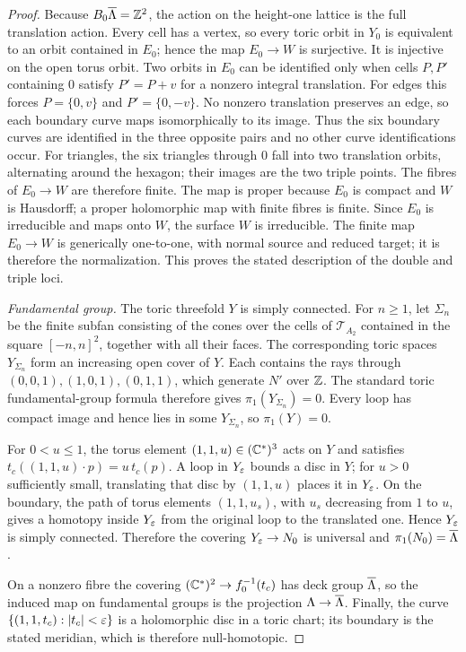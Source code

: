 \begin{proof}
Because $B_0\overline\Lambda=\mathbb Z^2$, the action on the height-one lattice
is the full translation action.  Every cell has a vertex, so every toric
orbit in $Y_0$ is equivalent to an orbit contained in $E_0$; hence the map
$E_0\to W$ is surjective.  It is injective on the open torus orbit.  Two
orbits in $E_0$ can be identified only when cells $P,P'$ containing $0$
satisfy $P'=P+v$ for a nonzero integral translation.  For edges this
forces $P=\{0,v\}$ and $P'=\{0,-v\}$.  No nonzero translation preserves
an edge, so each boundary curve maps isomorphically to its image.  Thus
the six boundary curves are identified in the three opposite pairs and no
other curve identifications occur.  For triangles, the six triangles through $0$ fall into two
translation orbits, alternating around the hexagon; their images are the
two triple points.  The fibres of $E_0\to W$ are therefore finite.  The map is proper because
$E_0$ is compact and $W$ is Hausdorff; a proper holomorphic map with finite
fibres is finite.  Since $E_0$ is irreducible and maps onto $W$, the surface
$W$ is irreducible.  The finite map $E_0\to W$ is generically one-to-one,
with normal source and reduced target; it is therefore the normalization.  This proves the stated
description of the double and triple loci.

\smallskip
\noindent\emph{Fundamental group.}
The toric threefold $Y$ is simply connected.  For $n\ge1$, let
$\Sigma_n$ be the finite subfan consisting of the cones over the cells of
$\mathcal T_{A_2}$ contained in the square $[-n,n]^2$, together with all
their faces.  The corresponding toric spaces $Y_{\Sigma_n}$ form an
increasing open cover of $Y$.  Each contains the rays through
$(0,0,1),(1,0,1),(0,1,1)$, which generate $N'$ over $\mathbb Z$.  The standard
toric fundamental-group formula \cite[Sec.~3.2]{Fulton} therefore gives
$\pi_1(Y_{\Sigma_n})=0$.  Every loop has compact image and hence lies
in some $Y_{\Sigma_n}$, so $\pi_1(Y)=0$.

For $0<u\leq1$, the torus element $(1,1,u)\in(\mathbb C^*)^3$ acts on $Y$ and
satisfies $t_c((1,1,u)\cdot p)=u\,t_c(p)$.  A loop in $Y_\varepsilon$ bounds a
disc in $Y$; for $u>0$ sufficiently small, translating that disc by
$(1,1,u)$ places it in $Y_\varepsilon$.  On the boundary, the path of torus
elements $(1,1,u_s)$, with $u_s$ decreasing from $1$ to $u$, gives a
homotopy inside $Y_\varepsilon$ from the original loop to the translated one.
Hence $Y_\varepsilon$ is simply connected.
Therefore the covering $Y_\varepsilon\to N_0$ is universal and
$\pi_1(N_0)=\overline\Lambda$.

On a nonzero fibre the covering $(\mathbb C^*)^2\to f_0^{-1}(t_c)$ has deck group
$\overline\Lambda$, so the induced map on fundamental groups is the projection
$\Lambda\to\overline\Lambda$.  Finally, the curve
$\{(1,1,t_c):|t_c|<\varepsilon\}$ is a holomorphic disc in a toric chart; its
boundary is the stated meridian, which is therefore null-homotopic.
\end{proof}


